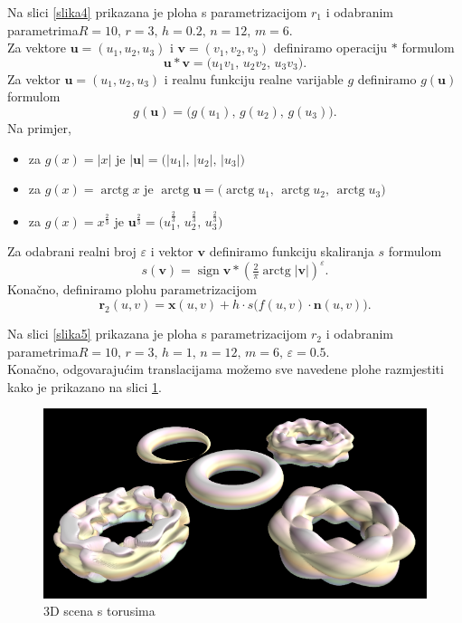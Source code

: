 \documentclass[a4paper,12pt]{article}
\theoremstyle{zad}
\DeclareMathOperator{\arctg}{\mathrm{arctg}}
\DeclareMathOperator{\sign}{\mathrm{sign}}
\begin{document}
\noindent Na slici \ref{slika4} prikazana je ploha s parametrizacijom $r_1$ i odabranim parametrima\linebreak $R=10,\,r=3,\,h=0.2,\,n=12,\,m=6$.\\[8pt] 
Za vektore $\mathbf{u}=(u_1,u_2,u_3)$ i $\mathbf{v}=(v_1,v_2,v_3)$ def\mbox{}iniramo operaciju $\ast$ formulom
$$\mathbf{u}\mathrel{\ast}\mathbf{v}=\big(u_1v_1,\,u_2v_2,\,u_3v_3\big).$$
Za vektor $\mathbf{u}=(u_1,u_2,u_3)$ i realnu funkciju realne varijable $g$ def\mbox{}iniramo $g(\mathbf{u})$ formulom
$$g(\mathbf{u})=\big(g(u_1),\,g(u_2),\,g(u_3)\big).$$
Na primjer, 
\begin{itemize}
\item za $g(x)=|x|$ je $|\mathbf{u}|=\big(|u_1|,\,|u_2|,\,|u_3|\big)$
\item za $g(x)=\arctg{x}$ je $\arctg{\mathbf{u}}=\big(\arctg{u_1},\,\arctg{u_2},\,\arctg{u_3}\big)$ 
\item za $g(x)=x^{\frac{2}{3}}$ je $\mathbf{u}^{\frac{2}{3}}=\Big(u_1^{\frac{2}{3}},\,u_2^{\frac{2}{3}},\,u_3^{\frac{2}{3}}\Big)$
\end{itemize}
Za odabrani realni broj $\varepsilon$ i vektor $\mathbf{v}$ def\mbox{}iniramo funkciju skaliranja $s$ formulom
$$s(\mathbf{v})=\sign{\mathbf{v}}\mathrel{\ast}\left(\tfrac{2}{\pi}\arctg{\mathbf{|v|}}\right)^{\varepsilon}.$$
Kona\v{c}no, def\mbox{}iniramo plohu parametrizacijom
$$\mathbf{r}_2(u,v)=\mathbf{x}(u,v)+h\cdot s\big(f(u,v)\cdot\mathbf{n}(u,v)\big).$$

\noindent Na slici \ref{slika5} prikazana je ploha s parametrizacijom $r_2$ i odabranim parametrima\linebreak $R=10,\,r=3,\,h=1,\,n=12,\,m=6,\,\varepsilon=0.5$.\\[8pt]
Konačno, odgovarajućim translacijama možemo sve navedene plohe razmjestiti kako je prikazano na slici \ref{svi_torusi}.

\begin{figure}[!h]
\centering
\includegraphics[scale=0.35]{sv_torus6.png}
\vspace*{-5pt}
\caption{3D scena s torusima}
\label{svi_torusi}
\end{figure}
\end{document}
